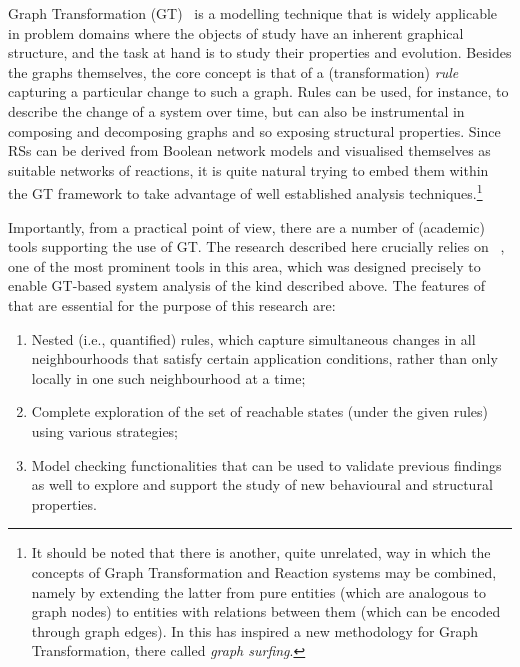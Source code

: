 Graph Transformation (GT)~\cite{DBLP:series/eatcs/EhrigEPT06,DBLP:books/sp/HeckelT20} is a modelling technique that is widely applicable in problem domains where the objects of study have an inherent graphical structure, and the task at hand is to study their properties and evolution. Besides the graphs themselves, the core concept is that of a (transformation) \emph{rule} capturing a particular change to such a graph. Rules can be used, for instance, to describe the change of a system over time, but can also be instrumental in composing and decomposing graphs and so exposing structural properties.
Since RSs can be derived from Boolean network models and visualised themselves as suitable networks of reactions, it is quite natural trying to embed them within the GT framework to take advantage of well established analysis techniques.\footnote{It should be noted that there is another, quite unrelated, way in which the concepts of Graph Transformation and Reaction systems may be combined, namely by extending the latter from pure entities (which are analogous to graph nodes) to entities with relations between them (which can be encoded through graph edges). In \cite{DBLP:journals/jlap/KreowskiR19} this has inspired a new methodology for Graph Transformation, there called \emph{graph surfing}.}

Importantly, from a practical point of view, there are a number of (academic) tools supporting the use of GT. The research described here crucially relies on \href{https://groove.cs.utwente.nl}{\GROOVE}~\cite{DBLP:journals/sttt/GhamarianMRZZ12}, one of the most prominent tools in this area, which was designed precisely to enable GT-based system analysis of the kind described above. The features of \GROOVE that are essential for the purpose of this research are:
\begin{enumerate}%
\item Nested (i.e., quantified) rules, which capture simultaneous changes in all neighbourhoods that satisfy certain application conditions, rather than only locally in one such neighbourhood at a time; 
\item Complete exploration of the set of reachable states (under the given rules) using various strategies;
\item Model checking functionalities that can be used to validate previous findings as well to explore and support the study of new behavioural and structural properties.
\end{enumerate}

